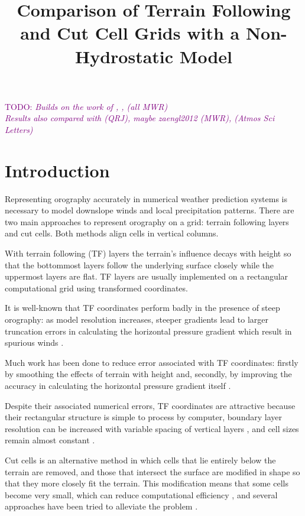 \documentclass[twocol]{ametsoc}
\title{Comparison of Terrain Following and Cut Cell Grids with a Non-Hydrostatic Model}
\affiliation{}
\begin{document}
\newcommand{\TODO}[1]{\textcolor{purple}{TODO: \emph{#1}}}

\maketitle

\TODO{Builds on the work of \citet{schaer2002}, \citet{klemp2011}, \citet{weller-shahrokhi2014} (all MWR) \\
Results also compared with \citet{melvin2010} (QRJ), maybe zaengl2012 (MWR), \citet{good2014} (Atmos Sci Letters)}

\section{Introduction}
Representing orography accurately in numerical weather prediction systems is necessary to model downslope winds and local precipitation patterns.  There are two main approaches to represent orography on a grid: terrain following layers and cut cells.  Both methods align cells in vertical columns.

With terrain following (TF) layers the terrain's influence decays with height so that the bottommost layers follow the underlying surface closely while the uppermost layers are flat.  TF layers are usually implemented on a rectangular computational grid using transformed coordinates.

It is well-known that TF coordinates perform badly in the presence of steep orography: as model resolution increases, steeper gradients lead to larger truncation errors in calculating the horizontal pressure gradient which result in spurious winds \citep{dempsey-davis1998,steppeler2002}.

Much work has been done to reduce error associated with TF coordinates: firstly by smoothing the effects of terrain with height \citep{schaer2002,leuenberger2010,klemp2011} and, secondly, by improving the accuracy in calculating the horizontal pressure gradient itself \citep{klemp2011,zaengl2012}.

Despite their associated numerical errors, TF coordinates are attractive because their rectangular structure is simple to process by computer, boundary layer resolution can be increased with variable spacing of vertical layers \citep{schaer2002}, and cell sizes remain almost constant \citep{jebens2011}.

Cut cells is an alternative method in which cells that lie entirely below the terrain are removed, and those that intersect the surface are modified in shape so that they more closely fit the terrain.  This modification means that some cells become very small, which can reduce computational efficiency \citep{klein2009}, and several approaches have been tried to alleviate the problem \citep{steppeler2002,yamazaki-satomura2010,jebens2011}.
\end{document}
